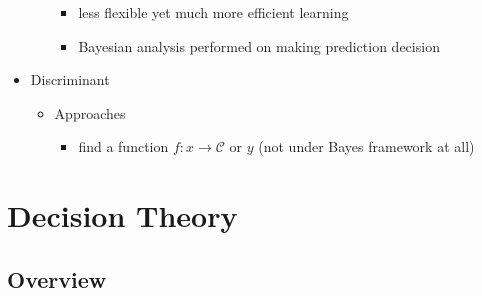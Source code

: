 \begin{itemize}
\begin{itemize}
\begin{itemize}
		\item less flexible yet much more efficient learning
		\item Bayesian analysis performed on making prediction decision
		\end{itemize}
	\end{itemize}
\item Discriminant
	\begin{itemize}
	\item Approaches
		\begin{itemize}
		\item find a function $f:x\rightarrow \mathcal C$ or $y$ (not under Bayes framework at all)
		\end{itemize}
	\end{itemize}
\end{itemize}

\section{Decision Theory}
\subsection{Overview}

